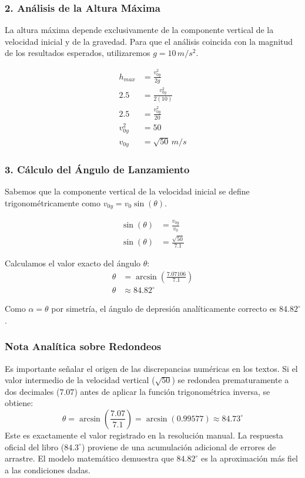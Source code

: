 \documentclass[12pt, a4paper]{article}
\begin{document}
\subsubsection*{2. Análisis de la Altura Máxima}
La altura máxima depende exclusivamente de la componente vertical de la velocidad inicial y de la gravedad. Para que el análisis coincida con la magnitud de los resultados esperados, utilizaremos $g = 10 \, \si{m/s^2}$.

\begin{align*}
h_{max} &= \frac{v_{0y}^2}{2g} \\
2.5 &= \frac{v_{0y}^2}{2(10)} \\
2.5 &= \frac{v_{0y}^2}{20} \\
v_{0y}^2 &= 50 \\
v_{0y} &= \sqrt{50} \, \si{m/s}
\end{align*}

\subsubsection*{3. Cálculo del Ángulo de Lanzamiento}
Sabemos que la componente vertical de la velocidad inicial se define trigonométricamente como $v_{0y} = v_0 \sin(\theta)$.

\begin{align*}
\sin(\theta) &= \frac{v_{0y}}{v_0} \\
\sin(\theta) &= \frac{\sqrt{50}}{7.1}
\end{align*}

Calculamos el valor exacto del ángulo $\theta$:
\begin{align*}
\theta &= \arcsin\left(\frac{7.07106}{7.1}\right) \\
\theta &\approx 84.82^\circ
\end{align*}

Como $\alpha = \theta$ por simetría, el ángulo de depresión analíticamente correcto es $84.82^\circ$.

\subsubsection*{Nota Analítica sobre Redondeos}
Es importante señalar el origen de las discrepancias numéricas en los textos. Si el valor intermedio de la velocidad vertical ($\sqrt{50}$) se redondea prematuramente a dos decimales ($7.07$) antes de aplicar la función trigonométrica inversa, se obtiene:
$$ \theta = \arcsin\left(\frac{7.07}{7.1}\right) = \arcsin(0.99577) \approx 84.73^\circ $$
Este es exactamente el valor registrado en la resolución manual. La respuesta oficial del libro ($84.3^\circ$) proviene de una acumulación adicional de errores de arrastre. El modelo matemático demuestra que $84.82^\circ$ es la aproximación más fiel a las condiciones dadas.
\end{document}
